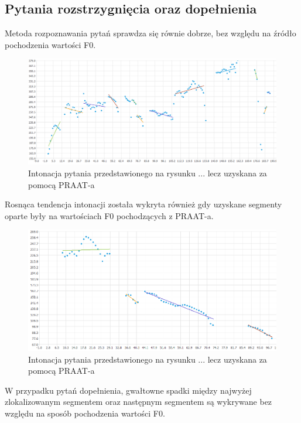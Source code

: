 \documentclass[a4paper,12 pt]{report}
\begin{document}
\subsection{Pytania rozstrzygnięcia oraz dopełnienia}
Metoda rozpoznawania pytań sprawdza się równie dobrze, bez względu na źródło pochodzenia wartości F0.

\begin{figure}[h]
\centering
\includegraphics[scale=0.7]{pytanie_rozstrzygniecia_2_emocje_praat.png}
\caption{Intonacja pytania przedstawionego na rysunku ... lecz uzyskana za pomocą PRAAT-a}
\end{figure}
\FloatBarrier
Rosnąca tendencja intonacji została wykryta również gdy uzyskane segmenty oparte były na wartościach F0 pochodzących z PRAAT-a.

\begin{figure}[h]
\centering
\includegraphics[scale=0.7]{pytanie_dopelnienia_praat_2.png}
\caption{Intonacja pytania przedstawionego na rysunku ... lecz uzyskana za pomocą PRAAT-a}
\end{figure}
\FloatBarrier

W przypadku pytań dopełnienia, gwałtowne spadki między najwyżej zlokalizowanym segmentem oraz następnym segmentem są wykrywane bez względu na sposób pochodzenia wartości F0.
\end{document}
